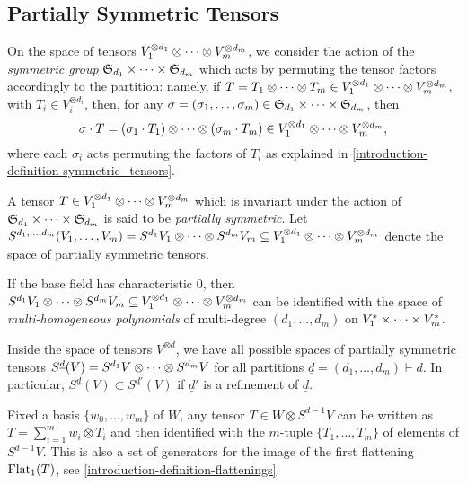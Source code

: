 \subsection{Partially Symmetric Tensors}
\label{introduction-subsection-partially_symmetric_tensors}
On the space of tensors $V_1^{\otimes d_1}\otimes \cdots \otimes V_m^{\otimes d_m}$, we consider the action of the \emph{symmetric group} $\mathfrak{S}_{d_1} \times \cdots \times \mathfrak{S}_{d_m}$ which acts by permuting the tensor factors accordingly to the partition: namely, if $T = T_1 \otimes \cdots \otimes T_m \in V_1^{\otimes d_1}\otimes \cdots \otimes V_m^{\otimes d_m}$, with $T_i \in V_i^{\otimes d_i}$, then, for any $\sigma = (\sigma_1,\ldots,\sigma_m)\in \mathfrak{S}_{d_1} \times \cdots \times \mathfrak{S}_{d_m}$, then \[\sigma \cdot T = (\sigma_1\cdot T_1) \otimes \cdots \otimes (\sigma_m\cdot T_m) \in V_1^{\otimes d_1}\otimes \cdots \otimes V_m^{\otimes d_m},\] where each $\sigma_i$ acts permuting the factors of $T_i$ as explained in \ref{introduction-definition-symmetric_tensors}.

\begin{definition}
\label{introduction-definition-partially_symmetric_tensors}    
A tensor $T \in V_1^{\otimes d_1}\otimes \cdots \otimes V_m^{\otimes d_m}$ which is invariant under the action of $\mathfrak{S}_{d_1} \times \cdots \times \mathfrak{S}_{d_m}$ is said to be \emph{partially symmetric}. Let $S^{d_1,\ldots,d_m}(V_1,\ldots,V_m) = S^{d_1} V_1 \otimes \cdots \otimes S^{d_m}V_m \subseteq V_1^{\otimes d_1}\otimes \cdots \otimes V_m^{\otimes d_m}$ denote the space of partially symmetric tensors. 

If the base field has characteristic $0$, then $S^{d_1} V_1 \otimes \cdots \otimes S^{d_m}V_m \subseteq V_1^{\otimes d_1}\otimes \cdots \otimes V_m^{\otimes d_m}$ can be identified with the space of \emph{multi-homogeneous polynomials} of multi-degree $(d_1,\ldots,d_m)$ on $V^*_1 \times \cdots \times V^*_m$. 
\end{definition}

Inside the space of tensors $V^{\otimes d}$, we have all possible spaces of partially symmetric tensors $S^{\underline{d}}(V) = S^{d_1} V \otimes \cdots \otimes S^{d_m}V$ for all partitions $\underline{d} = (d_1,\ldots,d_m)\vdash d$. In particular, $S^{\underline{d}}(V) \subset S^{\underline{d'}}(V)$ if $\underline{d}'$ is a refinement of $\underline{d}$.

Fixed a basis $\{w_0,\ldots,w_m\}$ of $W$, any tensor $T \in W \otimes S^{d-1} V$ can be written as $T = \sum_{i=1}^m w_i \otimes T_i$ and then identified with the $m$-tuple $\{T_1,\ldots,T_m\}$ of elements of $S^{d-1} V$. This is also a set of generators for the image of the first flattening $\mathrm{Flat}_1(T)$, see \ref{introduction-definition-flattenings}.

